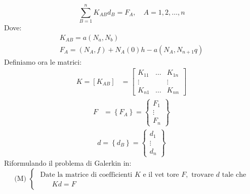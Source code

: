     \begin{equation}
        \sum_{B=1}^{n} K_{A B} d_{B}=F_{A}, \quad A=1,2, \ldots, n
    \end{equation}
    Dove:
    \begin{equation}
        \begin{array}{c}
        K_{A B}=a\left(N_{a}, N_{b}\right) \\
        F_{A}=\left(N_{A}, f\right)+N_{A}(0) h-a\left(N_{A}, N_{n+1} q\right)
        \end{array}
    \end{equation}
    Definiamo ora le matrici:
    \begin{equation}
        \begin{aligned}
        K=\left[K_{A B}\right] &=\left[\begin{array}{ccc}
        K_{11} & \ldots & K_{1 n} \\
        \vdots & & \vdots \\
        K_{n 1} & \ldots & K_{n n}
        \end{array}\right]
        \end{aligned}
    \end{equation}
    \begin{equation}
        \begin{aligned}
        F &=\left\{F_{A}\right\}=\left\{\begin{array}{c}
        F_{1} \\
        \vdots \\
        F_{n}
        \end{array}\right\}
    \end{aligned}
\end{equation}
\begin{equation}
    \begin{aligned}
        d=\left\{d_{B}\right\}=\left\{\begin{array}{c}
        d_{1} \\
        \vdots \\
        d_{n}
        \end{array}\right\}
    \end{aligned}
\end{equation}
    Riformulando il problema di Galerkin in:
    \begin{equation}
        \text { (M) }\left\{\begin{array}{l}
        \text { Date la matrice di coefficienti } K \text { e il vet tore } F, \text { trovare } d \text { tale che } \\
        \qquad K d=F
        \end{array}\right.
        \end{equation}

